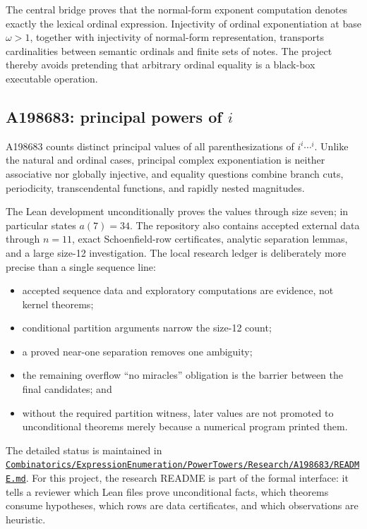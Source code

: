 \documentclass[
  10pt,
  a4paper,
  twoside,
  open=any,
  parskip=half,
  headings=big
]{scrreprt}
\newcommand{\CommitFull}{56a402bf82a9aab119fcbe3e96b991d387b221c5}
\newcommand{\RepoWeb}{https://github.com/VladimirReshetnikov/ProveIt}
\newcommand{\RepoBlobBase}{\RepoWeb/blob/\CommitFull}
\newcommand{\code}[1]{\texttt{\detokenize{#1}}}
\newcommand{\RepoFile}[1]{\href{\RepoBlobBase/#1}{\nolinkurl{#1}}}
\begin{document}
The central bridge proves that the normal-form exponent computation denotes exactly the lexical ordinal expression. Injectivity of ordinal exponentiation at base $\omega>1$, together with injectivity of normal-form representation, transports cardinalities between semantic ordinals and finite sets of notes. The project thereby avoids pretending that arbitrary ordinal equality is a black-box executable operation.

\subsection[A198683: principal powers of i]{A198683: principal powers of $i$}

A198683 counts distinct principal values of all parenthesizations of $i^i\cdots^i$. Unlike the natural and ordinal cases, principal complex exponentiation is neither associative nor globally injective, and equality questions combine branch cuts, periodicity, transcendental functions, and rapidly nested magnitudes.

The Lean development unconditionally proves the values through size seven; in particular \code{a198683_seven} states $a(7)=34$. The repository also contains accepted external data through $n=11$, exact Schoenfield-row certificates, analytic separation lemmas, and a large size-12 investigation. The local research ledger is deliberately more precise than a single sequence line:

\begin{itemize}
  \item accepted sequence data and exploratory computations are evidence, not kernel theorems;
  \item conditional partition arguments narrow the size-12 count;
  \item a proved near-one separation removes one ambiguity;
  \item the remaining overflow ``no miracles'' obligation is the barrier between the final candidates; and
  \item without the required partition witness, later values are not promoted to unconditional theorems merely because a numerical program printed them.
\end{itemize}

The detailed status is maintained in
\RepoFile{Combinatorics/ExpressionEnumeration/PowerTowers/Research/A198683/README.md}.
For this project, the research README is part of the formal interface: it tells a reviewer which Lean files prove unconditional facts, which theorems consume hypotheses, which rows are data certificates, and which observations are heuristic.
\end{document}
